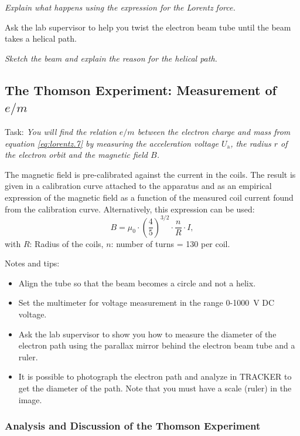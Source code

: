 \documentclass[../Elmag-labhefte-2020.tex]{subfiles}
\begin{document}
\emph{Explain what happens using the expression for the Lorentz force.}

Ask the lab supervisor to help you twist the electron beam tube until the beam takes a helical path.

\emph{Sketch the beam and explain the reason for the helical path.}

\subsection{The Thomson Experiment: Measurement of \(e/m\)}

Task:
\emph{You will find the relation \(e /m\) between the electron charge and mass from equation \eqref{eq:lorentz.7} by measuring the acceleration voltage $U_\mathrm{a}$, the radius $r$ of the electron orbit and the magnetic field $B$.}

The magnetic field is pre-calibrated against the current in the coils. The result is given in a calibration curve attached to the apparatus and as an empirical expression of the magnetic field as a function of the measured coil current found from the calibration curve. Alternatively, this expression can be used:
\begin{equation}
    B=\mu_0 \cdot \left(\frac{4}{5} \right)^{3/2}\cdot \frac{n}{R} \cdot I,
\end{equation}
with \(R\): Radius of the coils, \(n\): number of turns = 130 per coil.

Notes and tips:
\begin{itemize}
    \item Align the tube so that the beam becomes a circle and not a helix.
    \item Set the multimeter for voltage measurement in the range 0-\SI{1000}{\volt} DC voltage.
    \item Ask the lab supervisor to show you how to measure the diameter of the electron path using the parallax mirror behind the electron beam tube and a ruler.
    \item It is possible to photograph the electron path and analyze in TRACKER to get the diameter of the path. Note that you must have a scale (ruler) in the image.
\end{itemize}

\subsubsection{Analysis and Discussion of the Thomson Experiment}
\end{document}

